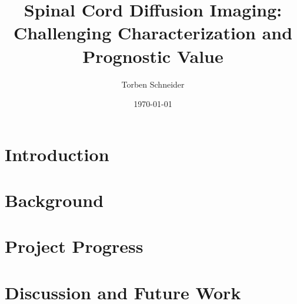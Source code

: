 \documentclass[a4paper]{scrreprt}
\begin{document}
 
\title{Spinal Cord Diffusion Imaging: Challenging Characterization and Prognostic Value} 
\date{\today} 
\author{Torben Schneider} 
\maketitle 
\chapter{Introduction}
\label{chap:introduction}

\chapter{Background}
\label{chap:background}   
 
\chapter{Project Progress}
\label{chap:projects}
 



\chapter{Discussion and Future Work}
\label{chap:discussion}




\end{document}
